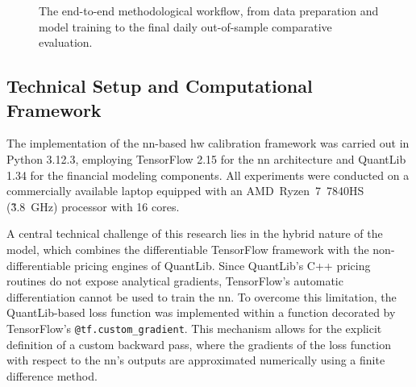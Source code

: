 \begin{figure}[H]
	\caption{The end-to-end methodological workflow, from data preparation and model training to the final daily out-of-sample comparative evaluation.}
	\label{fig:workflow_chart}
\end{figure}

\subsection{Technical Setup and Computational Framework}
\label{subsec:technical_setup}
The implementation of the \ac{nn}-based \ac{hw} calibration framework was carried out in Python 3.12.3, employing TensorFlow 2.15 for the \ac{nn} architecture and QuantLib 1.34 for the financial modeling components. All experiments were conducted on a commercially available laptop equipped with an AMD~Ryzen~7~7840HS (\~ 3.8~GHz) processor with 16 cores.

A central technical challenge of this research lies in the hybrid nature of the model, which combines the differentiable TensorFlow framework with the non-differentiable pricing engines of QuantLib. Since QuantLib's C++ pricing routines do not expose analytical gradients, TensorFlow's automatic differentiation cannot be used to train the \ac{nn}. To overcome this limitation, the QuantLib-based loss function was implemented within a function decorated by TensorFlow's \texttt{@tf.custom\_gradient}. This mechanism allows for the explicit definition of a custom backward pass, where the gradients of the loss function with respect to the \ac{nn}'s outputs are approximated numerically using a finite difference method.

